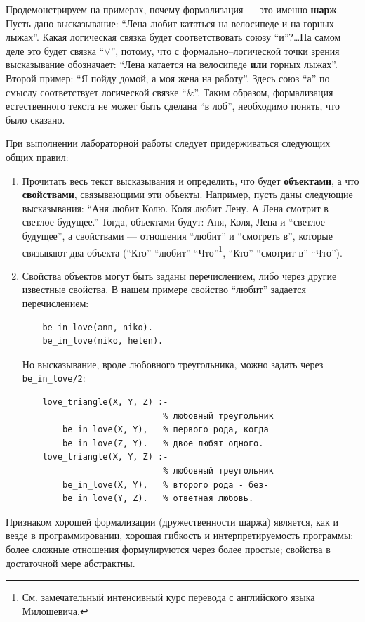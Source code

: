 \documentclass[12pt, openany, twoside]{book} %
\begin{document}
Продемонстрируем на примерах, почему формализация --- это именно {\bf шарж}. Пусть дано высказывание: ``Лена любит кататься на велосипеде и на горных лыжах''. Какая логическая связка будет соответствовать союзу ``и''?\ldots На самом деле это будет связка ``$\vee$'', потому, что с формально--логической точки зрения высказывание обозначает: ``Лена катается на велосипеде {\bf или} горных лыжах''. Второй пример: ``Я пойду домой, а моя жена на работу''. Здесь союз ``а'' по смыслу соответствует логической связке ``\&''. Таким образом, формализация естественного текста не может быть сделана ``в лоб'', необходимо понять, что было сказано.

При выполнении лабораторной работы следует придерживаться следующих общих правил:
\begin{enumerate}
\item Прочитать весь текст высказывания и определить, что будет {\bf объектами}, а что {\bf свойствами}, связывающими эти объекты. Например, пусть даны следующие высказывания: ``Аня любит Колю. Коля любит Лену. А Лена смотрит в светлое будущее.'' Тогда, объектами будут: Аня, Коля, Лена и ``светлое будущее'', а свойствами --- отношения ``любит'' и ``смотреть в'', которые связывают два объекта (``Кто'' ``любит''
``Что''\footnote{См. замечательный интенсивный курс перевода с английского языка Милошевича.}, ``Кто'' ``смотрит в'' ``Что'').
\item Свойства объектов могут быть заданы перечислением, либо через другие известные свойства. В нашем примере свойство ``любит'' задается перечислением:
{\tt\begin{verbatim}
    be_in_love(ann, niko).
    be_in_love(niko, helen).
\end{verbatim}}
\noindent Но высказывание, вроде любовного треугольника, можно задать через {\tt be\_in\_love/2}:
{\tt\begin{verbatim}
    love_triangle(X, Y, Z) :-
                            % любовный треугольник
        be_in_love(X, Y),   % первого рода, когда
        be_in_love(Z, Y).   % двое любят одного.
    love_triangle(X, Y, Z) :-
                            % любовный треугольник
        be_in_love(X, Y),   % второго рода - без-
        be_in_love(Y, Z).   % ответная любовь.
\end{verbatim}}
\end{enumerate}

Признаком хорошей формализации (дружественности шаржа) является, как и везде в программировании, хорошая гибкость и интерпретируемость программы: более сложные отношения формулируются через более простые; свойства в достаточной мере абстрактны.
\end{document}
